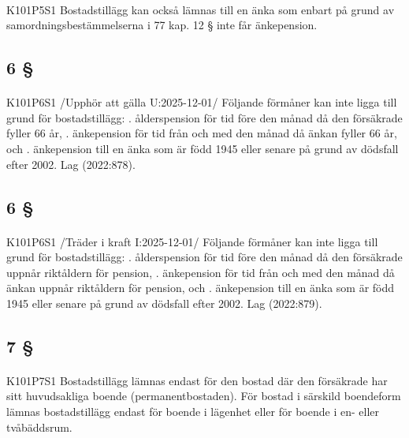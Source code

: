\documentclass[a4paper,notitlepage,openany,10pt]{book}
\begin{document}
\paragraph*{}
{\tiny K101P5S1}
Bostadstillägg kan också lämnas till en änka som enbart på grund av samordningsbestämmelserna i 77 kap. 12 § inte får änkepension.
\subsection*{6 §}
\paragraph*{}
{\tiny K101P6S1}
/Upphör att gälla U:2025-12-01/
Följande förmåner kan inte ligga till grund för bostadstillägg:
. ålderspension för tid före den månad då den försäkrade fyller 66 år,
. änkepension för tid från och med den månad då änkan fyller 66 år, och
. änkepension till en änka som är född 1945 eller senare på grund av dödsfall efter 2002.
Lag (2022:878).
\subsection*{6 §}
\paragraph*{}
{\tiny K101P6S1}
/Träder i kraft I:2025-12-01/
Följande förmåner kan inte ligga till grund för bostadstillägg:
. ålderspension för tid före den månad då den försäkrade uppnår riktåldern för pension,
. änkepension för tid från och med den månad då änkan uppnår riktåldern för pension, och
. änkepension till en änka som är född 1945 eller senare på grund av dödsfall efter 2002.
Lag (2022:879).
\subsection*{7 §}
\paragraph*{}
{\tiny K101P7S1}
Bostadstillägg lämnas endast för den bostad där den försäkrade har sitt huvudsakliga boende (permanentbostaden).
För bostad i särskild boendeform lämnas bostadstillägg endast för boende i lägenhet eller för boende i en- eller tvåbäddsrum.
\end{document}
